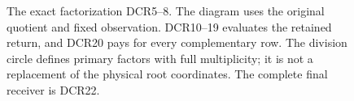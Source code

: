 \documentclass[11pt]{article}
\newcommand{\C}{\mathbb C}\newcommand{\Pp}{\mathcal P}
\begin{document}
\begin{figure}[ht]\centering
{}
\caption{The exact factorization DCR5--8. The diagram uses the
original quotient and fixed observation. DCR10--19 evaluates the
retained return, and DCR20 pays for every complementary row.
The division circle defines primary factors with full multiplicity;
it is not a replacement of the physical root coordinates.
The complete final receiver is DCR22.}
\end{figure}
\end{document}
